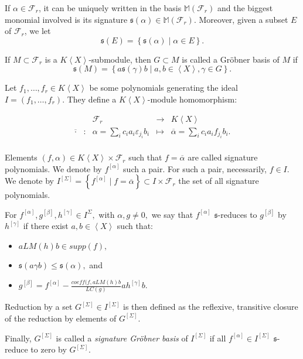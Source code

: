 \documentclass[sigconf]{acmart}
\theoremstyle{plain}
\theoremstyle{definition}
\theoremstyle{remark}
\newcommand{\MM}{\mathbb M}
\newcommand{\LC}{LC}
\newcommand{\LM}{LM}
\newcommand{\KX}{K \left\langle X \right\rangle}
\begin{document}
If $\alpha \in \mathscr{F}_r$, it can be uniquely
written in the basis 
$\MM \left( \mathscr{F}_r \right) $
and the biggest monomial
involved is its signature
$\mathfrak{s}(\alpha) \in \MM (\mathscr{F}_r)$.
Moreover, given a subset $E$ of $\mathscr{F}_r$, we let
\[\mathfrak{s}(E)=\left\{\mathfrak{s}(\alpha)\mid \alpha\in E\right\}.\]

If $M \subset \mathscr{F}_r$
is a $\KX$-submodule,
then $G \subset M$ is called
a Gröbner basis of $M$ if
\[\mathfrak{s}(M)= \left\lbrace a \mathfrak{s}(\gamma) b \mid a,b \in \left\langle X \right\rangle, \gamma \in G \right\rbrace. \]

Let $f_1,\dots,f_r \in \KX$
be some polynomials
generating the ideal $I=(f_1,\dots,f_r).$
They define a 
$\KX$-module homomorphism:

\[
\begin{array}{ccccc}
&& \mathscr{F}_r & \rightarrow & \KX \\
\overline{\cdot}& : &\alpha = \sum_i c_i a_i \varepsilon_{j_i} b_i&\mapsto& \overline{\alpha}=\sum_i c_i a_i f_{j_i} b_i. \\
\end{array}\]

Elements $(f,\alpha) \in \KX \times \mathscr{F}_r$
such that $f=\overline{\alpha}$
are called signature polynomials.
We denote by $f^{[\alpha]}$
such a pair. 
For such a pair, necessarily,
$f \in I.$
We denote by $I^{[\Sigma ]}=\left\lbrace f^{[\alpha]} \mid f=\overline{\alpha} \right\rbrace \subset I \times \mathscr{F}_r$
the set of all signature
polynomials.

For $f^{[\alpha]},g^{[\beta]},
h^{[\gamma]} \in I^{\Sigma},$
with $\alpha, g \neq 0,$
we say that 
$f^{[\alpha]}$ $\mathfrak{s}$-reduces to
$g^{[\beta]}$ by
$h^{[\gamma]}$
if there exist $a,b \in 
\left\langle X \right\rangle$
such that:
\begin{itemize}
\item $a \LM(h)b \in supp(f),$
\item $\mathfrak{s}(a \gamma b) \leq \mathfrak{s}(\alpha),$ and
\item $g^{[\beta]}=f^{[\alpha]}-\frac{coeff(f,a \LM(h)b}{\LC(g)} a h^{[\gamma]}b.$
\end{itemize}
Reduction by a set $G^{[\Sigma]} \in I^{[\Sigma]}$
is then defined as the 
reflexive, transitive closure
of the reduction by elements
of $G^{[\Sigma]} $.

Finally, $G^{[\Sigma]} $
is called a \textit{signature
Gröbner basis} of $I^{[\Sigma]}$ if all
$f^{[\alpha]} \in I^{[\Sigma]}$ $\mathfrak{s}$-reduce to zero by $G^{[\Sigma]}.$
\end{document}
